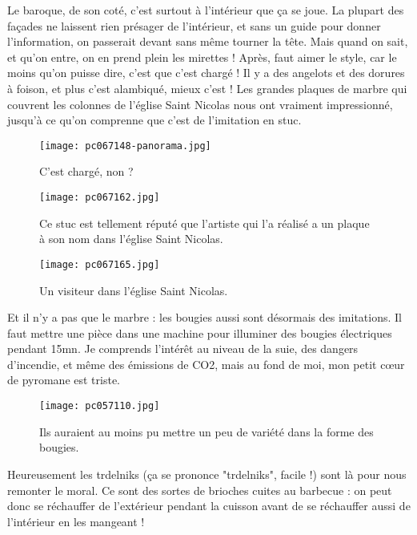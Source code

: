 \documentclass{book}
\begin{document}
Le baroque, de son coté, c'est surtout à l'intérieur que ça se joue. La plupart des façades ne laissent rien présager de l'intérieur, et sans un guide pour donner l'information, on passerait devant sans même tourner la tête. Mais quand on sait, et qu'on entre, on en prend plein les mirettes ! Après, faut aimer le style, car le moins qu'on puisse dire, c'est que c'est chargé ! Il y a des angelots et des dorures à foison, et plus c'est alambiqué, mieux c'est ! Les grandes plaques de marbre qui couvrent les colonnes de l'église Saint Nicolas nous ont vraiment impressionné, jusqu'à ce qu'on comprenne que c'est de l'imitation en stuc.


\begin{figure}[h]
\centering
\texttt{[image: pc067148-panorama.jpg]}
\caption*{C'est chargé, non ?}
\end{figure}


\begin{figure}[h]
\centering
\texttt{[image: pc067162.jpg]}
\caption*{Ce stuc est tellement réputé que l'artiste qui l'a réalisé a un plaque à son nom dans l'église Saint Nicolas.}
\end{figure}


\begin{figure}[h]
\centering
\texttt{[image: pc067165.jpg]}
\caption*{Un visiteur dans l'église Saint Nicolas.}
\end{figure}

Et il n'y a pas que le marbre : les bougies aussi sont désormais des imitations. Il faut mettre une pièce dans une machine pour illuminer des bougies électriques pendant 15mn. Je comprends l'intérêt au niveau de la suie, des dangers d'incendie, et même des émissions de CO2, mais au fond de moi, mon petit cœur de pyromane est triste.


\begin{figure}[h]
\centering
\texttt{[image: pc057110.jpg]}
\caption*{Ils auraient au moins pu mettre un peu de variété dans la forme des bougies.}
\end{figure}

Heureusement les trdelniks (ça se prononce "trdelniks", facile !) sont là pour nous remonter le moral. Ce sont des sortes de brioches cuites au barbecue : on peut donc se réchauffer de l'extérieur pendant la cuisson avant de se réchauffer aussi de l'intérieur en les mangeant !
\end{document}
